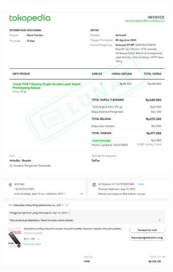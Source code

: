 \documentclass{article} %
\begin{document}
	\begin{figure}[H]
		\centering
		\includegraphics[width=0.8\textwidth]{images/pcb0}
	\end{figure}
	
	\begin{figure}[H]
		\centering
		\includegraphics[width=0.8\textwidth]{images/stm32}
	\end{figure}
\end{document}
